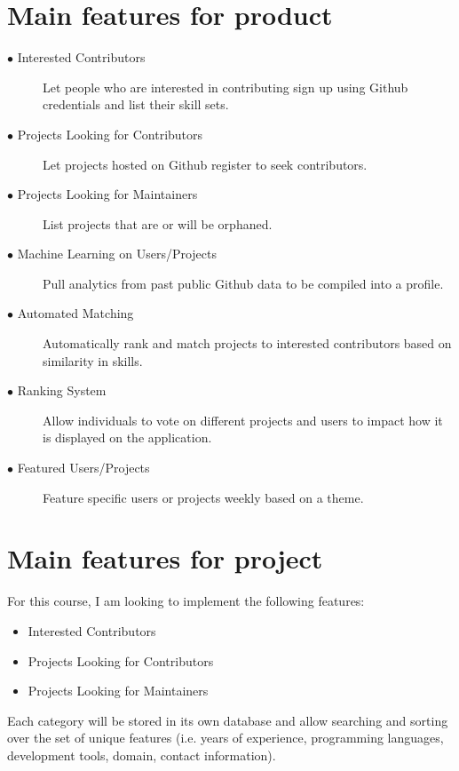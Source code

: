 \documentclass[11pt]{article}
\begin{document}
\section{Main features for product}
\begin{description}
\item [$\bullet$ Interested Contributors] Let people who are interested in contributing sign up using Github credentials and list their skill sets. 
\item [$\bullet$ Projects Looking for Contributors] Let projects hosted on Github register to seek contributors.
\item [$\bullet$ Projects Looking for Maintainers] List projects that are or will be orphaned.
\item [$\bullet$ Machine Learning on Users/Projects] Pull analytics from past public Github data to be compiled into a profile.
\item [$\bullet$ Automated Matching] Automatically rank and match projects to interested contributors based on similarity in skills.
\item [$\bullet$ Ranking System] Allow individuals to vote on different projects and users to impact how it is displayed on the application.
\item [$\bullet$ Featured Users/Projects] Feature specific users or projects weekly based on a theme.
\end{description}

\section{Main features for project}
For this course, I am looking to implement the following features:
\begin{itemize}
\item  Interested Contributors
\item Projects Looking for Contributors
\item Projects Looking for Maintainers
\end{itemize}
Each category will be stored in its own database and allow searching and sorting over the set of unique features (i.e. years of experience, programming languages, development tools, domain, contact information).
\end{document}
